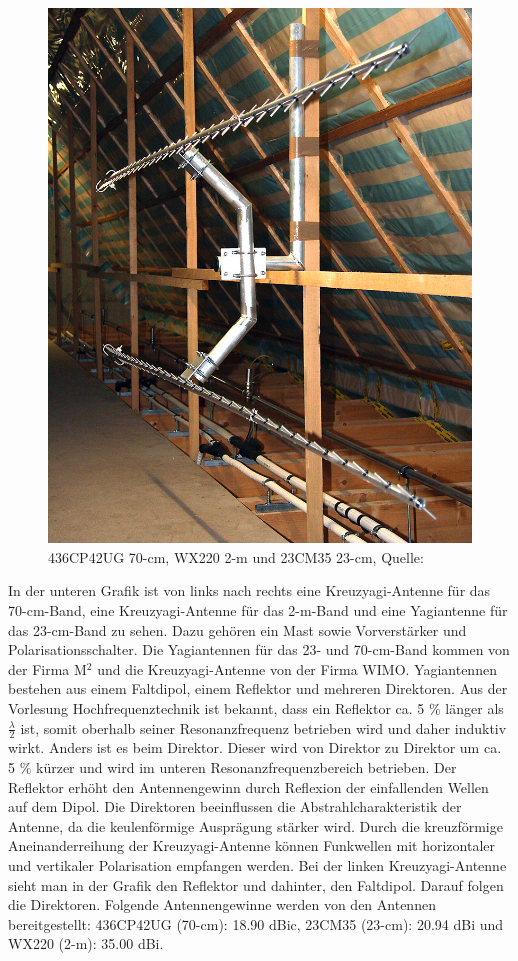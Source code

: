 \begin{figure}
\begin{minipage}[t]{0.2\textwidth}
		\includegraphics[width=\textwidth]{images/antenne3}
	\end{minipage}
	\caption[Antennen]{436CP42UG 70-cm, WX220 2-m und 23CM35 23-cm, Quelle: \cite{dk0te}}
	\label{fig: antennen}
\end{figure}
In der unteren Grafik ist von links nach rechts eine Kreuzyagi-Antenne für das 70-cm-Band, eine Kreuzyagi-Antenne für das 2-m-Band und eine 
Yagiantenne für das 23-cm-Band zu sehen. Dazu gehören ein Mast sowie Vorverstärker und Polarisationsschalter. Die Yagiantennen für das 23- und 
70-cm-Band kommen von der Firma M$^2$ und die Kreuzyagi-Antenne von der Firma WIMO. Yagiantennen bestehen aus einem Faltdipol, einem Reflektor und 
mehreren Direktoren. Aus der Vorlesung Hochfrequenztechnik \cite{hfscript} ist bekannt, dass ein Reflektor ca. 5 $\%$ länger als $\frac{\lambda}{2}$ 
ist, somit oberhalb seiner Resonanzfrequenz betrieben wird und daher induktiv wirkt.  Anders ist es beim Direktor. Dieser wird von Direktor zu 
Direktor um ca. 5 $\%$ kürzer und wird im unteren Resonanzfrequenzbereich betrieben. Der Reflektor erhöht den Antennengewinn durch Reflexion der 
einfallenden Wellen auf dem Dipol. Die Direktoren beeinflussen die Abstrahlcharakteristik der Antenne, da die keulenförmige Ausprägung stärker wird.  
Durch die kreuzförmige Aneinanderreihung der Kreuzyagi-Antenne können Funkwellen mit horizontaler und vertikaler Polarisation empfangen werden. Bei 
der linken Kreuzyagi-Antenne sieht man in der Grafik den Reflektor und dahinter, den Faltdipol. Darauf folgen die Direktoren. Folgende 
Antennengewinne werden von den Antennen bereitgestellt: 436CP42UG (70-cm): 18.90 dBic, 23CM35 (23-cm): 20.94 dBi und WX220 (2-m): 35.00 dBi.
\clearpage

